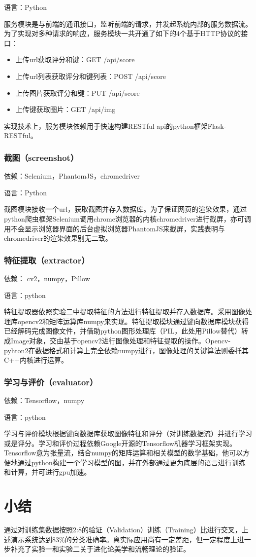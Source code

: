 语言：Python

服务模块是与前端的通讯接口，监听前端的请求，并发起系统内部的服务数据流。为了实现对多种请求的响应，服务模块一共开通了如下的4个基于HTTP协议的接口：

\begin{itemize}
  \item 上传url获取评分和键：GET  /api/score
  \item 上传url列表获取评分和键列表：POST  /api/score
  \item 上传图片获取评分和键：PUT  /api/score
  \item 上传键获取图片：GET /api/img
\end{itemize}

实现技术上，服务模块依赖用于快速构建RESTful api的python框架Flask-RESTful。

\subsubsection{截图（screenshot）}

依赖：Selenium，PhantomJS，chromedriver

语言：Python

截图模块接收一个url，获取截图并存入数据库。为了保证网页的渲染效果，通过python爬虫框架Selenium调用chrome浏览器的内核chromedriver进行截屏，亦可调用不会显示浏览器界面的后台虚拟浏览器PhantomJS来截屏，实践表明与chromedriver的渲染效果别无二致。

\subsubsection{特征提取（extractor）}
依赖： cv2，numpy，Pillow

语言：python

特征提取器依照实验二中提取特征的方法进行特征提取并存入数据库。采用图像处理库opencv2和矩阵运算库numpy来实现。特征提取模块通过键向数据库模块获得已经解码完成图像文件，并借助python图形处理库（PIL，此处用Pillow替代）转成Image对象，交由基于opencv2进行图像处理和特征提取的操作。Opencv-pyhton2在数据格式和计算上完全依赖numpy进行，图像处理的关键算法则委托其C++内核进行运算。

\subsubsection{学习与评价（evaluator）}
依赖：Tensorflow，numpy

语言：python

学习与评价模块根据键向数据库获取图像特征和评分（对训练数据流）并进行学习或是评分。学习和评价过程依赖Google开源的Tensorflow机器学习框架实现。Tensorflow意为张量流，结合numpy的矩阵运算和相关模型的数学基础，他可以方便地通过python构建一个学习模型的图，并在外部通过更为底层的语言进行训练和计算，并可进行gpu加速。

\clearpage
\section{小结}
\label{sec:app-sum}
通过对训练集数据按照2:8的验证（Validation）训练（Training）比进行交叉，上述演示系统达到$83\%$的分类准确率。离实际应用尚有一定差距，但一定程度上进一步补充了实验一和实验二关于进化论美学和流畅理论的验证。
